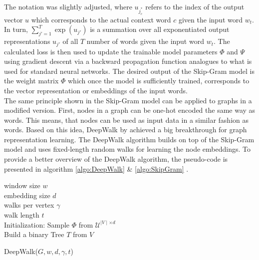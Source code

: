 	\noindent The notation was slightly adjusted, where $u_{j_{c}^{*}}$ refers
	to the index of the output vector $u$ which corresponds to the actual
	context word $c$ given the input word $w_{t}$. In turn, 
	$\sum_{j'=1}^{T}\exp(u_{j'})$ is a summation over all exponentiated output 
	representations $u_{j'}$ of all $T$ number of words given the input word 
	$w_{t}$. The calculated loss is then used to update the trainable model 
	parameters $\Phi$ and $\Psi$ using gradient descent via a backward 
	propagation function analogues to what is used for standard neural 
	networks. The desired output of the Skip-Gram model is the weight matrix
	$\Phi$ which once the model is sufficiently trained, corresponds to the
	vector representation or embeddings of the input words. \\

	\noindent The same principle shown in the Skip-Gram model can be applied
	to graphs in a modified version. First, nodes in a graph can be one-hot
	encoded the same way as words. This means, that nodes can be used as input
	data in a similar fashion as words. Based on this idea, DeepWalk by
	\cite{perozzi2014deepwalk} achieved a big breakthrough for graph
	representation learning. The DeepWalk algorithm builds on top of the 
	Skip-Gram model and uses fixed-length random walks for learning the node 
	embeddings. To provide a better overview of the DeepWalk algorithm, 
	the pseudo-code is presented in algorithm \ref{algo:DeepWalk} \& 
	\ref{algo:SkipGram} \citep[p. 704]{perozzi2014deepwalk}.
	
	\begin{algorithm}[h]
		\scriptsize
		\SetAlgoLined
		window size $w$\\
		embedding size $d$\\
		walks per vertex $\gamma$\\
		walk length $t$\\
		\nl Initialization: Sample $\Phi$ from $\mathcal{U}^{\mid V
		\mid \times d}$ \\
		\nl Build a binary Tree $T$ from $V$ \\
		\nl {}
		\caption[DeepWalk]{DeepWalk($G,w,d,\gamma,t$)}
		\label{algo:DeepWalk}
	\end{algorithm}
	
